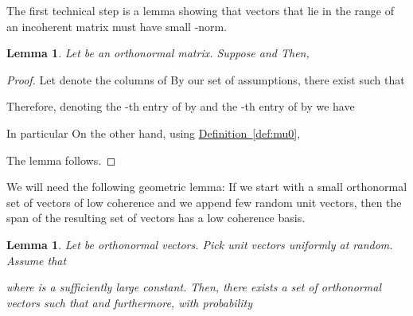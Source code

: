 \documentclass[letterpaper,11pt]{article}
\newtheorem{lemma}[theorem]{Lemma}
\theoremstyle{definition}
\newcommand{\definitionref}[1]{\hyperref[def:#1]{Definition~\ref{def:#1}}}
\newcommand{\lemmalabel}[1]{\label{lem:#1}}
\begin{document}
The first technical step is a lemma showing that vectors that lie in the range
of an incoherent matrix must have small -norm.

\begin{lemma}\lemmalabel{mu0-infty}
Let  be an orthonormal  matrix. Suppose  and
 Then,

\end{lemma}

\begin{proof}
Let  denote the columns of  By our set of assumptions, there
exist  such that

Therefore, denoting the
-th entry of  by  and the -th entry of  by  we have

In particular 
On the other hand,
using \definitionref{mu0},

The lemma follows.
\end{proof}

We will need the following geometric lemma: If we start with a small
orthonormal set of vectors of low coherence and we append few random unit
vectors, then the span of the resulting set of vectors has a low coherence
basis.

\begin{lemma}\lemmalabel{mu0-perturb}
Let  be orthonormal vectors. Pick unit vectors
 uniformly at random. Assume that

where  is a sufficiently large constant.
Then, there exists a
set of orthonormal vectors  such that
 and
furthermore, with probability 

\end{lemma}
\end{document}
